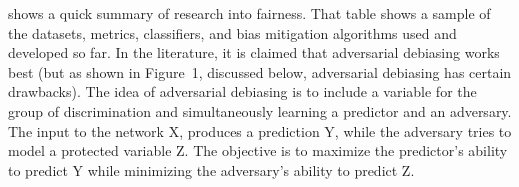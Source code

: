   
 
  shows a  quick summary of research into fairness. That table shows a sample of  the datasets, metrics, classifiers, and bias mitigation algorithms used and developed so far. In the literature, it is claimed that
adversarial debiasing works best\cite{Zhang:2018:MUB:3278721.3278779} (but as shown in Figure~1, discussed below, adversarial debiasing has certain drawbacks). The idea of adversarial debiasing is to include a variable for the group of discrimination and simultaneously learning a predictor and an adversary. The input to the network X, produces a prediction Y, while the adversary tries to model a protected variable Z. The objective is to maximize the predictor's ability to predict Y while minimizing the adversary's ability to predict Z. 

